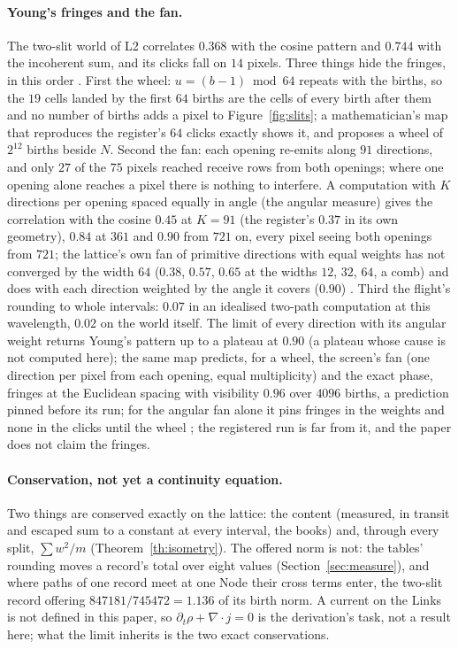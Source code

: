 \documentclass[11pt]{article}
\theoremstyle{definition}
\begin{document}
\paragraph{Young's fringes and the fan.} The two-slit world of L2
correlates $0.368$ with the cosine pattern and $0.744$ with the incoherent
sum, and its clicks fall on $14$ pixels. Three things hide the fringes,
in this order \cite{log}. First the wheel: $u = (b-1) \bmod 64$ repeats
with the births, so the $19$ cells landed by the first $64$ births are the
cells of every birth after them and no number of births adds a pixel to
Figure~\ref{fig:slits}; a mathematician's map that reproduces the register's $64$
clicks exactly shows it, and proposes a wheel of $2^{12}$ births beside
$N$. Second the fan: each opening re-emits along $91$ directions, and only
$27$ of the $75$ pixels reached receive rows from both openings; where one
opening alone reaches a pixel there is nothing to interfere. A computation
with $K$ directions per opening spaced equally in angle (the angular
measure) gives the correlation with the cosine $0.45$ at $K = 91$ (the
register's $0.37$ in its own geometry), $0.84$ at $361$ and $0.90$ from
$721$ on, every pixel seeing both openings from $721$; the lattice's own
fan of primitive directions with equal weights has not converged by the
width $64$ ($0.38$, $0.57$, $0.65$ at the widths $12$, $32$, $64$, a comb) and does with each direction weighted by the
angle it covers ($0.90$) \cite{log}. Third the flight's rounding to whole
intervals: $0.07$ in an idealised two-path computation at this
wavelength, $0.02$ on the world itself. The limit of every direction with
its angular weight returns Young's pattern up to a plateau at $0.90$ (a
plateau whose cause is not computed here); the same map predicts, for a
wheel, the screen's fan (one direction per pixel from each opening, equal
multiplicity) and the exact phase, fringes at the Euclidean spacing with
visibility $0.96$ over $4096$ births, a prediction pinned before its run;
for the angular fan alone it pins fringes in the weights and none in the
clicks until the wheel \cite{log}; the registered run is far from it, and the
paper does not claim the fringes.

\paragraph{Conservation, not yet a continuity equation.} Two things are
conserved exactly on the lattice: the content (measured, in transit and
escaped sum to a constant at every interval, the books) and, through
every split, $\sum w^2/m$ (Theorem~\ref{th:isometry}). The offered norm
is not: the tables' rounding moves a record's total over eight values
(Section~\ref{sec:measure}), and where paths of one record meet at one
Node their cross terms enter, the two-slit record offering $847181/745472
= 1.136$ of its birth norm. A current on the Links is not defined in this
paper, so $\partial_t \rho + \nabla \cdot j = 0$ is the derivation's task,
not a result here; what the limit inherits is the two exact conservations.
\end{document}
